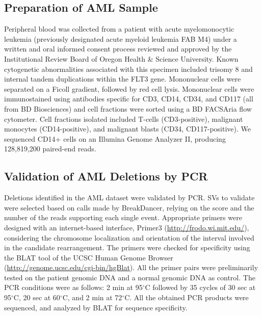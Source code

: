 \documentclass[11pt]{article}
\newcommand{\degree}{\ensuremath{^\circ}}
\begin{document}
\subsection{Preparation of AML Sample}

Peripheral blood was collected from a patient with acute myelomonocytic leukemia (previously designated acute myeloid leukemia FAB M4) under a written and oral informed consent process reviewed and approved by the Institutional Review Board of Oregon Health \& Science University. Known cytogenetic abnormalities associated with this specimen included trisomy 8 and internal tandem duplications within the FLT3 gene. Mononuclear cells were separated on a Ficoll gradient, followed by red cell lysis. Mononuclear cells were immunostained using antibodies specific for CD3, CD14, CD34, and CD117 (all from BD Biosciences) and cell fractions were sorted using a BD FACSAria flow cytometer. Cell fractions isolated included T-cells (CD3-positive), malignant monocytes (CD14-positive), and malignant blasts (CD34, CD117-positive). We sequenced CD14+ cells on an Illumina Genome Analyzer II, producing 128,819,200 paired-end reads.

\subsection{Validation of AML Deletions by PCR}

Deletions identified in the AML dataset were validated by PCR. SVs to validate were selected based on calls made by BreakDancer, relying on the score and the number of the reads supporting each single event. Appropriate primers were designed with an internet-based interface, Primer3 (\url{http://frodo.wi.mit.edu/}), considering the chromosome localization and orientation of the interval involved in the candidate rearrangement. The primers were checked for specificity using the BLAT tool of the UCSC Human Genome Browser (\url{http://genome.ucsc.edu/cgi-bin/hgBlat}). All the primer pairs were preliminarily tested on the patient genomic DNA and a normal genomic DNA as control. The PCR conditions were as follows: 2 min at 95\degree C followed by 35 cycles of 30 sec at 95\degree C, 20 sec at 60\degree C, and 2 min at 72\degree C. All the obtained PCR products were sequenced, and analyzed by BLAT for sequence specificity. 


%
%
%
%
%
%
%

\end{document}
